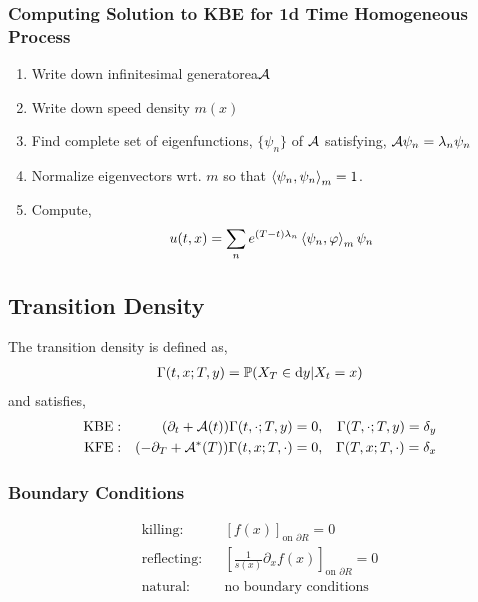 \documentclass[12pt]{article}
\begin{document}
\subsubsection{Computing Solution to KBE for 1d Time Homogeneous Process}
\begin{enumerate}[nolistsep]
    \item Write down infinitesimal generatorea\( \mathcal{A} \)
    \item Write down speed density \( m(x) \)
    \item Find complete set of eigenfunctions, \( \{ \psi_n \} \) of \( \mathcal{A} \) satisfying, \( \mathcal{A} \psi_n = \lambda_n\psi_n \)
    \item Normalize eigenvectors wrt. \( m \) so that \( \left\langle \psi_n,\psi_n \right\rangle_m = 1 \).
    \item Compute,
        \begin{align*}
            u(t,x) = \sum_{n} e^{(T-t)\lambda_n} \left\langle \psi_n,\varphi \right\rangle_m\psi_n
        \end{align*}
\end{enumerate}

\subsection{Transition Density}
The transition density is defined as,
\begin{align*}
    \Gamma(t,x;T,y) = \mathbb{P}(X_T\in\mathrm{d} y | X_t=  x)
\end{align*}
and satisfies,
\begin{align*}
    \text{KBE}: && (\partial_t + \mathcal{A}(t)) \Gamma(t,\cdot;T,y) = 0, && \Gamma(T,\cdot;T,y) = \delta_y \\
    \text{KFE}: && (-\partial_T + \mathcal{A}^*(T)) \Gamma(t,x;T,\cdot) = 0, && \Gamma(T,x;T,\cdot) = \delta_x
\end{align*}

\subsubsection{Boundary Conditions}

\begin{align*}
    \text{killing}: && \left[ f(x) \right]_{\text{on }\partial R} = 0 \\
    \text{reflecting}: && \left[ \frac{1}{s(x)}\partial_x f(x) \right]_{\text{on }\partial R} = 0 \\
    \text{natural}: && \text{no boundary conditions}
\end{align*}
\end{document}
